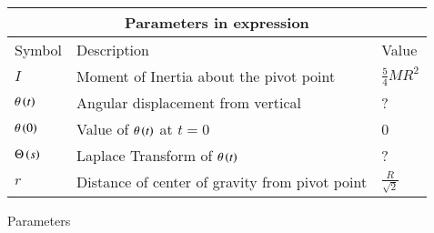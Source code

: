 \setlength{\arrayrulewidth}{0.3mm}
\setlength{\tabcolsep}{15pt}
\renewcommand{\arraystretch}{1.5}



\begin{tabular}{ |p{0.5 cm}|p{ 4cm}|p{1cm}| }
\hline
\multicolumn{3}{|c|}{Parameters in expression}\\
\hline
Symbol & Description & Value\\
\hline
$I$ & Moment of Inertia about the pivot point& $\frac{5}{4}MR^2$\\
\hline
$\theta \left(t\right)$ & Angular displacement from vertical & ?\\
\hline
$\theta \left(0\right)$ & Value of $\theta\left(t\right)$ at $t=0$ & 0\\
\hline
$\Theta \left(s\right)$ & Laplace Transform of $\theta \left(t\right)$ & ?\\
\hline
$r$ & Distance of center of gravity from pivot point & $\frac{R}{\sqrt{2}}$\\
\hline
\end{tabular}
\caption{Parameters}


